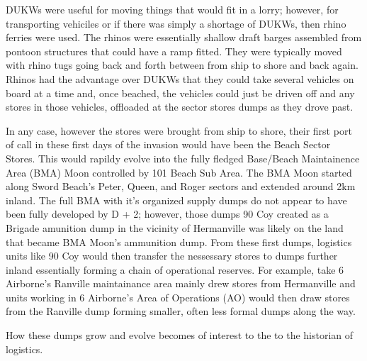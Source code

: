 \documentclass[noraggedright]{turabian-researchpaper}
\begin{document}
DUKWs were useful for moving things that would fit in a lorry; however, for
transporting vehiciles or if there was simply a shortage of DUKWs, then rhino
ferries were used.  The rhinos were essentially shallow draft barges assembled
from pontoon structures that could have a ramp fitted.  They were typically 
moved with rhino tugs going back and forth between from ship to shore and back
again.  Rhinos had the advantage over DUKWs that they could take several 
vehicles on board at a time and, once beached, the vehicles could just be
driven off and any stores in those vehicles, offloaded at the sector stores
dumps as they drove past.  

In any case, however the stores were brought from ship to shore, their first
port of call in these first days of the invasion would have been the Beach 
Sector Stores.  This would rapildy evolve into the fully fledged Base/Beach
Maintainence Area (BMA) Moon controlled by 101 Beach Sub Area.\autocite[See
traces in Neptune No. 1 RAF Beach Squadron Operation Order found in][]
{1raf}  The BMA Moon started along Sword Beach's Peter, Queen, and Roger
sectors and extended around 2km inland.  The full BMA with it's organized
supply dumps do not appear to have been fully developed by D + 2; however,
those dumps 90 Coy created as a Brigade amunition dump in the vicinity of
Hermanville was likely on the land that became BMA Moon's ammunition 
dump.\autocite[Trace of BMA Moon
annexed to Neptune RAF Beach Squadron Operation Order found in]
[Legend entry 67]{1raf}   From these first dumps, logistics units like 90 Coy
would then transfer the nessessary stores to dumps further inland essentially
forming a chain of operational reserves.  For example, take 6 Airborne's 
Ranville maintainance area mainly drew stores from Hermanville and units 
working in 6 Airborne's Area of Operations (AO) would then draw stores from
the Ranville dump forming smaller, often less formal dumps along the way.

How these dumps grow and evolve becomes of interest to the to the historian
of logistics.  



\end{document}
